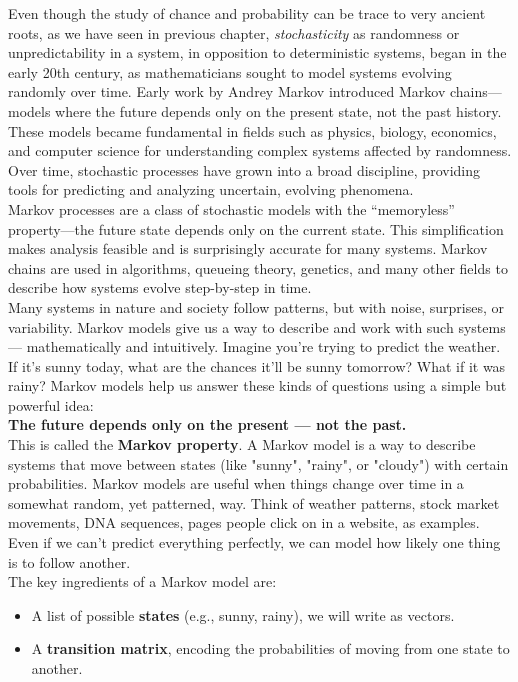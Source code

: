 \documentclass{book}
\begin{document}
Even though the study of chance and probability can be trace to very ancient roots, as we have seen in previous chapter, \textit{stochasticity} as randomness or unpredictability in a system, in opposition to deterministic systems, began in the early 20th century, as mathematicians sought to model systems evolving randomly over time. Early work by Andrey Markov introduced Markov chains—models where the future depends only on the present state, not the past history. These models became fundamental in fields such as physics, biology, economics, and computer science for understanding complex systems affected by randomness. Over time, stochastic processes have grown into a broad discipline, providing tools for predicting and analyzing uncertain, evolving phenomena.\\

Markov processes are a class of stochastic models with the “memoryless” property—the future state depends only on the current state. This simplification makes analysis feasible and is surprisingly accurate for many systems. Markov chains are used in algorithms, queueing theory, genetics, and many other fields to describe how systems evolve step-by-step in time.\\

Many systems in nature and society follow patterns, but with noise, surprises, or variability. Markov models give us a way to describe and work with such systems — mathematically and intuitively. Imagine you're trying to predict the weather. If it’s sunny today, what are the chances it’ll be sunny tomorrow? What if it was rainy? Markov models help us answer these kinds of questions using a simple but powerful idea:\\

\textbf{The future depends only on the present — not the past.}\\

This is called the \textbf{Markov property}. A Markov model is a way to describe systems that move between states (like "sunny", "rainy", or "cloudy") with certain probabilities. Markov models are useful when things change over time in a somewhat random, yet patterned, way. Think of weather patterns, stock market movements, DNA sequences, pages people click on in a website, as examples. Even if we can’t predict everything perfectly, we can model how likely one thing is to follow another.\\

The key ingredients of a Markov model are:
\begin{itemize}
  \item A list of possible \textbf{states} (e.g., sunny, rainy), we will write as vectors.
  \item A \textbf{transition matrix}, encoding the probabilities of moving from one state to another.
\end{itemize}
\end{document}
